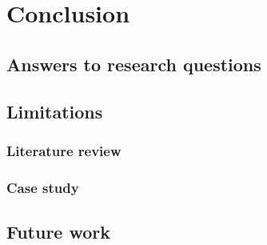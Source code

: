 
\chapter{Conclusion}
\label{chapter:conclusion}


\section{Answers to research questions}


\section{Limitations}

\subsection{Literature review}

\subsection{Case study}


\section{Future work}

